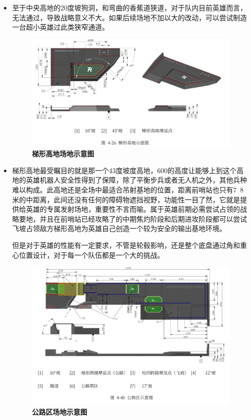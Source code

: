 \begin{itemize}
            \item 至于中央高地的20度坡狗洞，和弯曲的香蕉道狭道，对于队内目前英雄而言，无法通过，导致战略意义不大。如果后续场地不加以大的改动，可以尝试制造一台超小英雄过此类狭窄通道。

            \begin{figure}[H]
                \centering
                \includegraphics[height=0.35\textwidth]{figure/trapezoidalElevation.png}
                \hspace{0.5em}
                \caption{\textbf{\textbf{梯形高地场地示意图}}}
                \label{fig:trapezoidalElevation}
            \end{figure}

            \item 梯形高地最受瞩目的就是那一个43度坡度高地，600的高度让能够上到这个高地的英雄机器人安全性得到了保障，除了平衡步兵或者无人机之外，其他兵种难以构成。此高地还是全场中最适合吊射基地的位置，距离前哨站也只有7~8米的中距离，此间还没有任何的障碍物遮挡视野，功能性一目了然，它就是提供给英雄的专属发射场地，重要性不言而喻。属于英雄前期必需尝试占领的战略要地，并且在前哨站已经攻略了的中期焦灼阶段和后期进攻阶段都可以尝试飞坡占领敌方梯形高地为英雄自己创造一个较为安全的输出基地环境。

            但是对于英雄的性能有一定要求，不管是轮毂影响，还是整个底盘通过角和重心位置设计，对于每一个队伍都是一个大的挑战。
            
            \begin{figure}[H]
                \centering
                \includegraphics[height=0.35\textwidth]{figure/highwayArea.png}
                \hspace{0.5em}
                \caption{\textbf{\textbf{公路区场地示意图}}}
                \label{fig:highwayArea}
            \end{figure}


\end{itemize}
